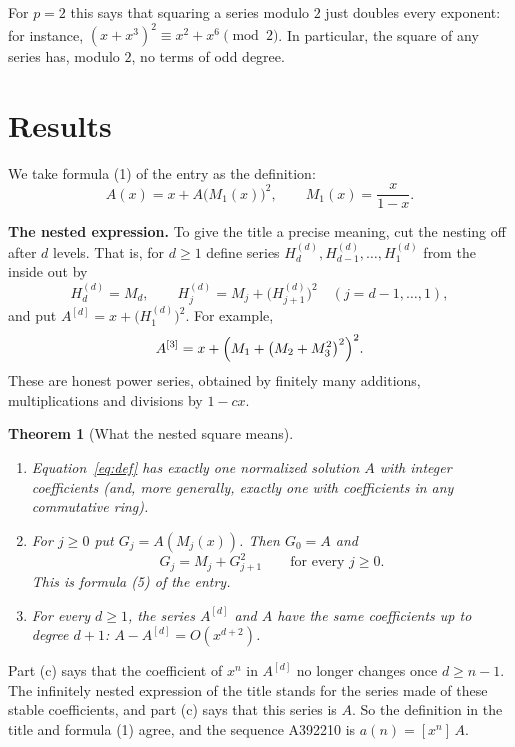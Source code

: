\documentclass[11pt,a4paper]{article}
\newtheorem{theorem}{Theorem}[section]
\theoremstyle{definition}
\theoremstyle{remark}
\newcommand{\coeff}[2]{[x^{#1}]\,#2}
\newcommand{\para}[1]{\par\medskip\noindent\textbf{#1}\enspace}
\begin{document}
For $p=2$ this says that squaring a series modulo $2$ just doubles every exponent: for instance,
$(x+x^3)^2\equiv x^2+x^6\pmod2$. In particular, the square of any series has, modulo $2$, no terms of odd degree.


\section{Results}\label{sec:results}

We take formula (1) of the entry as the definition:
\begin{equation}\label{eq:def}
A(x)=x+A\bigl(M_1(x)\bigr)^2,\qquad M_1(x)=\frac{x}{1-x}.
\end{equation}

\para{The nested expression.} To give the title a precise meaning, cut the nesting off after $d$ levels. That is, for
$d\ge1$ define series $H^{(d)}_d,H^{(d)}_{d-1},\dots,H^{(d)}_1$ from the inside out by
\[
H^{(d)}_d=M_d,\qquad H^{(d)}_j=M_j+\bigl(H^{(d)}_{j+1}\bigr)^2\quad(j=d-1,\dots,1),
\]
and put $A^{[d]}=x+\bigl(H^{(d)}_1\bigr)^2$. For example,
\[
A^{[3]}=x+\Bigl(M_1+\bigl(M_2+M_3^2\bigr)^2\Bigr)^2 .
\]
These are honest power series, obtained by finitely many additions, multiplications and divisions by $1-cx$.

\begin{theorem}[What the nested square means]\label{thm:def}
\begin{enumerate}[label=(\alph*)]
\item Equation~\eqref{eq:def} has exactly one normalized solution $A$ with integer coefficients (and, more generally,
exactly one with coefficients in any commutative ring).
\item For $j\ge0$ put $G_j=A(M_j(x))$. Then $G_0=A$ and
\[
G_j=M_j+G_{j+1}^2\qquad\text{for every }j\ge0 .
\]
This is formula (5) of the entry.
\item For every $d\ge1$, the series $A^{[d]}$ and $A$ have the same coefficients up to degree $d+1$:
$A-A^{[d]}=O(x^{d+2})$.
\end{enumerate}
\end{theorem}

Part (c) says that the coefficient of $x^n$ in $A^{[d]}$ no longer changes once $d\ge n-1$. The infinitely nested
expression of the title stands for the series made of these stable coefficients, and part (c) says that this series is
$A$. So the definition in the title and formula (1) agree, and the sequence A392210 is $a(n)=\coeff{n}{A}$.
\end{document}

